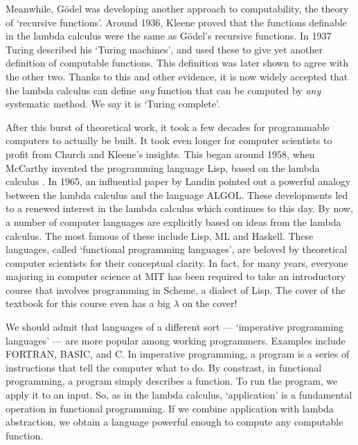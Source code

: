 \documentclass[12pt]{article}
\begin{document}
Meanwhile, G\"odel was developing another approach to computability,
the theory of `recursive functions'.  Around 1936, Kleene proved that
the functions definable in the lambda calculus were the same as
G\"odel's recursive functions.  In 1937 Turing described his `Turing
machines', and used these to give yet another definition of computable
functions.  This definition was later shown to agree with the other
two.  Thanks to this and other evidence, it is now widely accepted
that the lambda calculus can define {\it any} function that can be
computed by {\it any} systematic method.  We say it is `Turing
complete'.

After this burst of theoretical work, it took a few decades for
programmable computers to actually be built.  It took even longer for
computer scientists to profit from Church and Kleene's insights. 
This began around 1958, when McCarthy invented the programming
language Lisp, based on the lambda calculus \cite{McCarthy}.  
In 1965, an influential paper by Landin \cite{Landin} pointed 
out a powerful analogy between the lambda calculus and the language 
ALGOL.    These developments led to a renewed interest in the lambda 
calculus which continues to this day.  By now, a number of computer 
languages are explicitly based 
on ideas from the lambda calculus.  The most famous of these include Lisp, 
ML and Haskell.  These languages, called `functional programming languages',
are beloved by theoretical computer scientists for their conceptual
clarity.  In fact, for many years, everyone majoring in computer
science at MIT has been required to take an introductory course that
involves programming in Scheme, a dialect of Lisp.  The cover of the
textbook for this course \cite{Sussman} even has a big $\lambda$ on
the cover!

We should admit that languages of a different sort --- `imperative
programming languages' --- are more popular among working programmers.
Examples include FORTRAN, BASIC, and C.  In imperative programming, a
program is a series of instructions that tell the computer what to do.
By constrast, in functional programming, a program simply describes a
function.  To run the program, we apply it to an input.  So, as in the
lambda calculus, `application' is a fundamental operation in functional 
programming.  If we combine application with lambda abstraction, we
obtain a language powerful enough to compute any computable function.  
\end{document}
